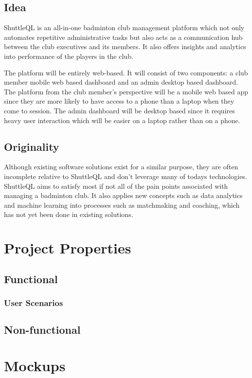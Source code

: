 \documentclass{article}
\begin{document}
\subsection{Idea}
ShuttleQL is an all-in-one badminton club management platform which not only
automates repetitive administrative tasks but also acts as a communication hub
between the club executives and its members. It also offers insights and
analytics into performance of the players in the club.

The platform will be entirely web-based. It will consist of two components:
a club member mobile web based dashboard and an admin desktop based dashboard.
The platform from the club member's perspective will be a mobile web based app
since they are more likely to have access to a phone than a laptop when they
come to session. The admin dashboard will be desktop based since it requires
heavy user interaction which will be easier on a laptop rather than on a phone.

\subsection{Originality}
Although existing software solutions exist for a similar purpose, they are often
incomplete relative to ShuttleQL and don't leverage many of todays technologies.
ShuttleQL aims to satisfy most if not all of the pain points associated with
managing a badminton club. It also applies new concepts such as data analytics and
machine learning into processes such as matchmaking and coaching, which has not
yet been done in existing solutions.

\section{Project Properties}
\subsection{Functional}
\subsubsection{User Scenarios}
\subsection{Non-functional}

\section{Mockups}
\end{document}
